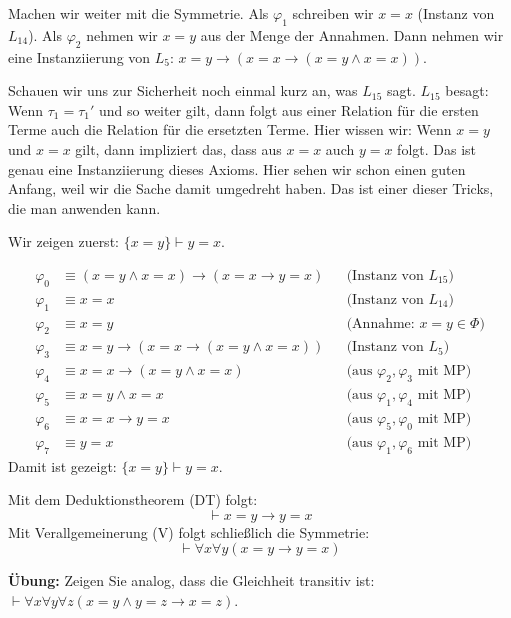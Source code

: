 \begin{spoken-clean}[00:56:17 - 01:00:57]
Machen wir weiter mit die Symmetrie. Als $\varphi_1$ schreiben wir $x = x$ (Instanz von $L_{14}$). Als $\varphi_2$ nehmen wir $x = y$ aus der Menge der Annahmen. Dann nehmen wir eine Instanziierung von $L_5$: $x = y \to (x = x \to (x = y \land x = x))$.

Schauen wir uns zur Sicherheit noch einmal kurz an, was $L_{15}$ sagt. $L_{15}$ besagt: Wenn $\tau_1 = \tau_1'$ und so weiter gilt, dann folgt aus einer Relation für die ersten Terme auch die Relation für die ersetzten Terme. Hier wissen wir: Wenn $x = y$ und $x = x$ gilt, dann impliziert das, dass aus $x = x$ auch $y = x$ folgt. Das ist genau eine Instanziierung dieses Axioms. Hier sehen wir schon einen guten Anfang, weil wir die Sache damit umgedreht haben. Das ist einer dieser Tricks, die man anwenden kann.
\end{spoken-clean}

\begin{math-stroke}
Wir zeigen zuerst: $\{x = y\} \vdash y = x$.

\begin{short-proof}
\begin{align*}
\varphi_0 &\equiv (x=y \land x=x) \to (x=x \to y=x) && \text{(Instanz von } L_{15}\text{)} \\
\varphi_1 &\equiv x = x && \text{(Instanz von } L_{14}\text{)} \\
\varphi_2 &\equiv x = y && \text{(Annahme: } x=y \in \Phi\text{)} \\
\varphi_3 &\equiv x=y \to (x=x \to (x=y \land x=x)) && \text{(Instanz von } L_5\text{)} \\
\varphi_4 &\equiv x=x \to (x=y \land x=x) && \text{(aus } \varphi_2, \varphi_3 \text{ mit MP)} \\
\varphi_5 &\equiv x=y \land x=x && \text{(aus } \varphi_1, \varphi_4 \text{ mit MP)} \\
\varphi_6 &\equiv x=x \to y=x && \text{(aus } \varphi_5, \varphi_0 \text{ mit MP)} \\
\varphi_7 &\equiv y=x && \text{(aus } \varphi_1, \varphi_6 \text{ mit MP)}
\end{align*}
Damit ist gezeigt: $\{x = y\} \vdash y = x$.

Mit dem Deduktionstheorem (DT) folgt:
\[
\vdash x=y \to y=x
\]
Mit Verallgemeinerung (V) folgt schließlich die Symmetrie:
\[
\vdash \forall x \forall y (x=y \to y=x)
\]
\end{short-proof}

\textbf{Übung:} Zeigen Sie analog, dass die Gleichheit transitiv ist: $\vdash \forall x \forall y \forall z (x=y \land y=z \to x=z)$.
\end{math-stroke}

